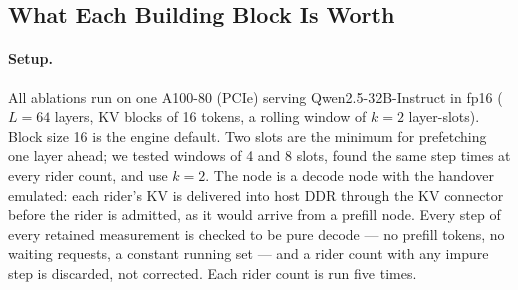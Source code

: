 
\subsection{What Each Building Block Is Worth}\label{sec:ablation}

\paragraph{Setup.} All ablations run on one A100-80 (PCIe) serving
Qwen2.5-32B-Instruct in fp16 ($L{=}64$ layers, KV blocks of 16 tokens, a rolling window
of $k{=}2$ layer-slots). Block size 16 is the engine default. Two slots are
the minimum for prefetching one layer ahead; we tested windows of 4 and 8
slots, found the same step times at every rider count, and use $k{=}2$. The node is a decode node with the handover emulated:
each rider's KV is delivered into host DDR through the KV connector before the
rider is admitted, as it would arrive from a prefill node. Every step of every
retained measurement is checked to be pure decode --- no prefill tokens, no
waiting requests, a constant running set --- and a rider count with any impure
step is discarded, not corrected. Each rider count is run five times.

